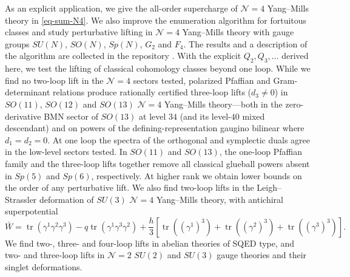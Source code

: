 \documentclass[11pt]{article}
\numberwithin{equation}{section}
\numberwithin{figure}{section}
\numberwithin{table}{section}
\begin{document}
As an explicit application, we give the all-order supercharge of $\mathcal N=4$ Yang--Mills theory in \eqref{eq-sum-N4}. We also improve the enumeration algorithm for fortuitous classes and study perturbative lifting in $\mathcal N=4$ Yang--Mills theory with gauge groups $SU(N)$, $SO(N)$, $Sp(N)$, $G_2$ and $F_4$. The results and a description of the algorithm are collected in the repository \cite{Repo}. With the explicit $Q_2,Q_3,\ldots$ derived here, we test the lifting of classical cohomology classes beyond one loop. While we find no two-loop lift in the $\mathcal N=4$ sectors tested, polarized Pfaffian and Gram-determinant relations produce rationally certified three-loop lifts ($d_3\ne0$) in $SO(11)$, $SO(12)$ and $SO(13)$ $\mathcal N=4$ Yang--Mills theory---both in the zero-derivative BMN sector of $SO(13)$ at level $34$ (and its level-$40$ mixed descendant) and on powers of the defining-representation gaugino bilinear where $d_1=d_2=0$. At one loop the spectra of the orthogonal and symplectic duals agree in the low-level sectors tested. In $SO(11)$ and $SO(13)$, the one-loop Pfaffian family and the three-loop lifts together remove all classical glueball powers absent in $Sp(5)$ and $Sp(6)$, respectively. At higher rank we obtain lower bounds on the order of any perturbative lift. We also find two-loop lifts in the Leigh--Strassler deformation \cite{LeighStrassler} of $SU(3)$ $\mathcal N=4$ Yang--Mills theory, with antichiral superpotential
\begin{equation*}
\bar W=\operatorname{tr}(\gamma^1\gamma^2\gamma^3)-q\operatorname{tr}(\gamma^1\gamma^3\gamma^2)+\frac{h}{3}\left[\operatorname{tr}((\gamma^1)^3)+\operatorname{tr}((\gamma^2)^3)+\operatorname{tr}((\gamma^3)^3)\right].
\end{equation*}
We find two-, three- and four-loop lifts in abelian theories of SQED type, and two- and three-loop lifts in $\mathcal N=2$ $SU(2)$ and $SU(3)$ gauge theories and their singlet deformations.
\end{document}

